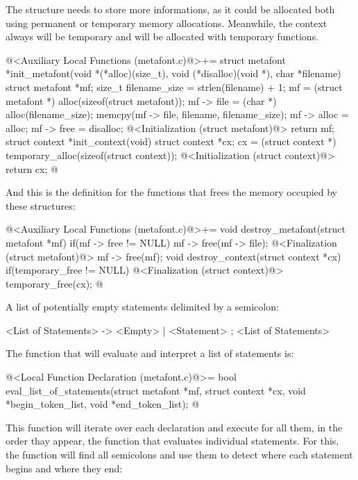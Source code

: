 The structure  needs to store more informations,
as it could be allocated both using permanent or temporary memory
allocations. Meanwhile, the context always will be temporary and will
be allocated with temporary functions.

\iniciocodigo
@<Auxiliary Local Functions (metafont.c)@>+=
struct metafont *init_metafont(void *(*alloc)(size_t),
                              void (*disalloc)(void *),
                              char *filename){
  struct metafont *mf;
  size_t filename_size = strlen(filename) + 1;
  mf = (struct metafont *) alloc(sizeof(struct metafont));
  mf -> file = (char *) alloc(filename_size);
  memcpy(mf -> file, filename, filename_size);
  mf -> alloc = alloc;
  mf -> free = disalloc;
  @<Initialization (struct metafont)@>
  return mf;
}
struct context *init_context(void){
  struct context *cx;
  cx = (struct context *) temporary_alloc(sizeof(struct context));
  @<Initialization (struct context)@>
  return cx;
}
@
\fimcodigo

And this is the definition for the functions that frees the memory
occupied by these structures:

\iniciocodigo
@<Auxiliary Local Functions (metafont.c)@>+=
void destroy_metafont(struct metafont *mf){
  if(mf -> free != NULL){
    mf -> free(mf -> file);
    @<Finalization (struct metafont)@>
    mf -> free(mf);
  }
}
void destroy_context(struct context *cx){
  if(temporary_free != NULL){
    @<Finalization (struct context)@>
    temporary_free(cx);
  }
}
@
\fimcodigo



A list of potentially empty statements delimited by a semicolon:

\alinhaverbatim
<List of Statements> -> <Empty> | <Statement> ; <List of Statements>
\alinhanormal

The function that will evaluate and interpret a list of statements is:

\iniciocodigo
@<Local Function Declaration (metafont.c)@>=
bool eval_list_of_statements(struct metafont *mf, struct context *cx,
                            void *begin_token_list, void *end_token_list);
@
\fimcodigo

This function will iterate over each declaration and execute for all
them, in the order thay appear, the function that evaluates individual
statements. For this, the function will find all semicolons and use
them to detect where each statement begins and where they end:

